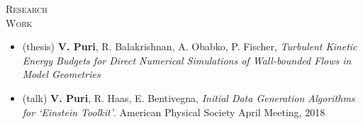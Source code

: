 \documentclass[10pt]{article}
\begin{document}
\vspace{-1.5em}
\begin{multicols}{2}
\textsc{\small Research \\ Work}
\columnbreak

\vspace{-2.0em}
\begin{itemize}[label= ]
    \setlength{\itemindent}{-2.5em}
    \setlength\itemsep{-0.5\itemsep}
    \item (thesis) \textbf{V. Puri}, R. Balakrishnan, A. Obabko, P. Fischer, {\sl Turbulent Kinetic Energy Budgets for Direct Numerical Simulations of Wall-bounded Flows in Model Geometries} 
    \item (talk) \textbf{V. Puri}, R. Haas, E. Bentivegna, {\sl Initial Data Generation Algorithms for `Einstein Toolkit'}. American Physical Society April Meeting, 2018
\end{itemize}
\vspace{-2.0em}


\end{multicols}
\vspace{-1.5em}
\end{document}
